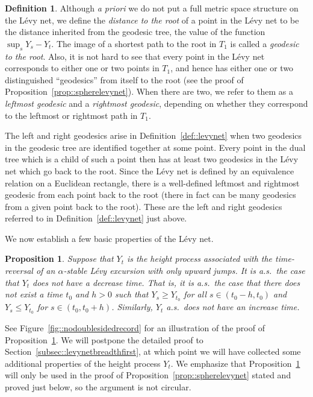 \documentclass[JEP,XML,SOM,Unicode]{cedram}
\theoremstyle{plain}
\numberwithin{theorem}{section}
\newtheorem{proposition}[theorem]{Proposition}
\theoremstyle{definition}
\newtheorem{definition}[theorem]{Definition}
\begin{document}
\begin{definition}
Although \emph{a priori} we do not put a full metric space structure on the Lévy net, we define the \emph{distance to the root} of a point in the Lévy net to be the distance inherited from the geodesic tree, \ie the value of the function $\sup_s Y_s-Y_t$. The image of a shortest path to the root in $T_1$ is called a \emph{geodesic to the root}. Also, it is not hard to see that every point in the Lévy net corresponds to either one or two points in $T_1$, and hence has either one or two distinguished ``geodesics'' from itself to the root (see the proof of Proposition~\ref{prop::spherelevynet}). When there are two, we refer to them as a \emph{leftmost geodesic} and a \emph{rightmost geodesic}, depending on whether they correspond to the leftmost or rightmost path in $T_1$.
\end{definition}

The left and right geodesics arise in Definition~\ref{def::levynet} when two geodesics in the geodesic tree are identified together at some point. Every point in the dual tree which is a child of such a point then has at least two geodesics in the Lévy net which go back to the root. Since the Lévy net is defined by an equivalence relation on a Euclidean rectangle, there is a well-defined leftmost and rightmost geodesic from each point back to the root (there in fact can be many geodesics from a given point back to the root). These are the left and right geodesics referred to in Definition~\ref{def::levynet} just above.

We now establish a few basic properties of the Lévy net.

\begin{proposition}
\label{prop::nodoublesidedrecord}
Suppose that $Y_t$ is the height process associated with the time-reversal of an $\alpha$-stable Lévy excursion with only upward jumps. It is a.s.\ the case that $Y_t$ does not have a decrease time. That is, it is a.s.\ the case that there does not exist a time $t_0$ and $h>0$ such that $Y_s \geq Y_{t_0}$ for all $s \in (t_0-h, t_0)$ and $Y_s \leq Y_{t_0}$ for $s \in (t_0, t_0+h)$. Similarly, $Y_t$ a.s.\ does not have an increase time.
\end{proposition}

See Figure~\ref{fig::nodoublesidedrecord} for an illustration of the proof of Proposition~\ref{prop::nodoublesidedrecord}. We will postpone the detailed proof to Section~\ref{subsec::levynetbreadthfirst}, at which point we will have collected some additional properties of the height process $Y_t$. We emphasize that Proposition~\ref{prop::nodoublesidedrecord} will only be used in the proof of Proposition~\ref{prop::spherelevynet} stated and proved just below, so the argument is not circular.
\end{document}
